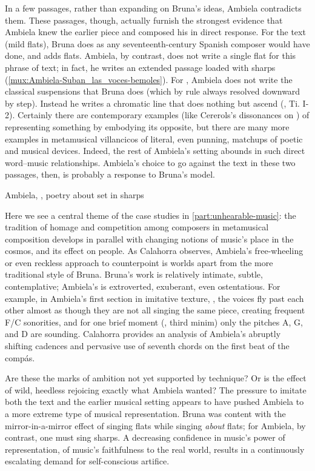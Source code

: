 In a few passages, rather than expanding on Bruna's ideas, Ambiela contradicts
them.
These passages, though, actually furnish the strongest evidence that Ambiela
knew the earlier piece and composed his in direct response.
For the text  (mild flats), Bruna does as any
seventeenth-century Spanish composer would have done, and adds flats.
Ambiela, by contrast, does not write a single flat for this phrase of text; in
fact, he writes an extended passage loaded with sharps
(\cref{mux:Ambiela-Suban_las_voces-bemoles}).
For , Ambiela does not write the classical
suspensions that Bruna does (which by rule always resolved downward by step).
Instead he writes a chromatic line that does nothing but ascend
(, Ti. I-2). 
Certainly there are contemporary examples (like Cererols's dissonances on
) of representing something by embodying its
opposite, but there are many more examples in metamusical villancicos of
literal, even punning, matchups of poetic and musical devices. 
Indeed, the rest of Ambiela's setting abounds in such direct word--music
relationships.
Ambiela's choice to go against the text in these two passages, then, is
probably a response to Bruna's model.

{Ambiela, , poetry about  set in sharps}

Here we see a central theme of the case studies in
\cref{part:unhearable-music}: the tradition of homage and competition among
composers in metamusical composition develops in parallel with changing notions
of music's place in the cosmos, and its effect on people.
As Calahorra observes, Ambiela's free-wheeling or even reckless approach to
counterpoint is worlds apart from the more traditional style of Bruna.
Bruna's work is relatively intimate, subtle, contemplative; Ambiela's is
extroverted, exuberant, even ostentatious.
For example, in Ambiela's first section in imitative texture, ,
the voices fly past each other almost as though they are not all singing the
same piece, creating frequent F\na{}/C\sh{} sonorities, and for one brief
moment (, third minim) only the pitches A, G, and D are sounding.
Calahorra provides an analysis of Ambiela's abruptly shifting cadences and
pervasive use of seventh chords on the first beat of the compás.

Are these the marks of ambition not yet supported by technique?
Or is the effect of wild, heedless rejoicing exactly what Ambiela wanted?
The pressure to imitate both the text and the earlier musical setting appears
to have pushed Ambiela to a more extreme type of musical representation.
Bruna was content with the mirror-in-a-mirror effect of singing flats while
singing \emph{about} flats; for Ambiela, by contrast, one must sing sharps.
A decreasing confidence in music's power of representation, of music's
faithfulness to the real world, results in a continuously escalating demand for
self-conscious artifice.  

